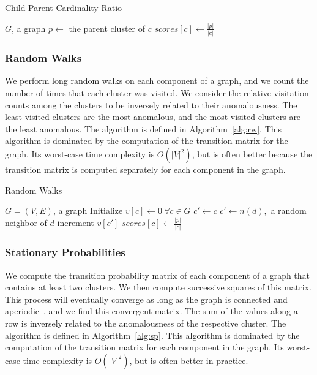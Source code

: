 \begin{algorithm}[h]
    \caption{Child-Parent Cardinality Ratio}
    \label{alg:cpcr}
\begin{algorithmic}[1]
    \REQUIRE $G$, a graph
        \STATE $p \gets$ the parent cluster of $c$
        \STATE $scores[c] \gets \frac{|p|}{|c|}$
    \ENDFOR
\end{algorithmic}
\end{algorithm}

\subsubsection{Random Walks}
We perform long random walks on each component of a graph, and we count the number of times that each cluster was visited.
We consider the relative visitation counts among the clusters to be inversely related to their anomalousness.
The least visited clusters are the most anomalous, and the most visited clusters are the least anomalous.
The algorithm is defined in Algorithm~\ref{alg:rw}.
This algorithm is dominated by the computation of the transition matrix for the graph.
Its worst-case time complexity is $O(|V|^2)$, but is often better because the transition matrix is computed separately for each component in the graph.

\begin{algorithm}[h]
    \caption{Random Walks}
    \label{alg:rw}
\begin{algorithmic}[1]
    \REQUIRE $G = (V,E)$, a graph
    \STATE Initialize $v[c] \gets 0 \ \forall c \in G$
        \STATE $c' \gets c$
            \STATE $c' \gets n(d),$ a random neighbor of $d$
            \STATE increment $v[c']$
        \ENDFOR
    \ENDFOR
        \STATE $scores[c] \gets \frac{|p|}{|c|}$
    \ENDFOR
\end{algorithmic}
\end{algorithm}

\subsubsection{Stationary Probabilities}
We compute the transition probability matrix of each component of a graph that contains at least two clusters.
We then compute successive squares of this matrix.
This process will eventually converge as long as the graph is connected and aperiodic~\cite{levin2017markov}, and we find this convergent matrix.
The sum of the values along a row is inversely related to the anomalousness of the respective cluster.
The algorithm is defined in Algorithm~\ref{alg:sp}.
This algorithm is dominated by the computation of the transition matrix for each component in the graph.
Its worst-case time complexity is $O(|V|^2)$, but is often better in practice.


